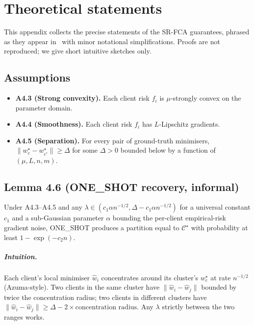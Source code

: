 \chapter{Theoretical statements}\label{ch:appendix-theorems}

This appendix collects the precise statements of the SR-FCA guarantees, phrased as they appear in~\parencite{vardhan2024srfca} with minor notational simplifications. Proofs are not reproduced; we give short intuitive sketches only.

\section*{Assumptions}

\begin{itemize}
    \item \textbf{A4.3 (Strong convexity).} Each client risk $f_i$ is $\mu$-strongly convex on the parameter domain.
    \item \textbf{A4.4 (Smoothness).} Each client risk $f_i$ has $L$-Lipschitz gradients.
    \item \textbf{A4.5 (Separation).} For every pair of ground-truth minimisers, $\lVert w_c^\star - w_{c'}^\star \rVert \ge \Delta$ for some $\Delta > 0$ bounded below by a function of $(\mu, L, n, m)$.
\end{itemize}

\section*{Lemma 4.6 (ONE\_SHOT recovery, informal)}

Under A4.3--A4.5 and any $\lambda \in (c_1 \alpha n^{-1/2}, \Delta - c_1 \alpha n^{-1/2})$ for a universal constant $c_1$ and a sub-Gaussian parameter $\alpha$ bounding the per-client empirical-risk gradient noise, ONE\_SHOT produces a partition equal to $\mathcal{C}^\star$ with probability at least $1 - \exp(-c_2 n)$.

\paragraph{Intuition.} Each client's local minimiser $\hat{w}_i$ concentrates around its cluster's $w_c^\star$ at rate $n^{-1/2}$ (Azuma-style). Two clients in the same cluster have $\lVert \hat{w}_i - \hat{w}_j\rVert$ bounded by twice the concentration radius; two clients in different clusters have $\lVert \hat{w}_i - \hat{w}_j\rVert \ge \Delta - 2 \times \text{concentration radius}$. Any $\lambda$ strictly between the two ranges works.

